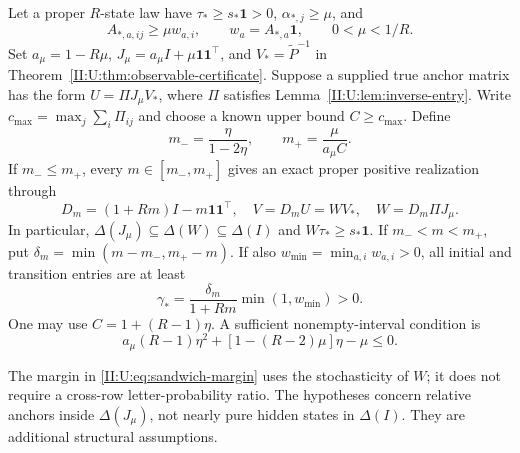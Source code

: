 \begin{theorem}
\label{II:U:thm:doeblin-sandwich}
Let a proper $R$-state law have $\tau_*\ge s_*\mathbf1>0$,
$\alpha_{*,j}\ge\mu$, and
\[
 A_{*,a,ij}\ge\mu w_{a,i},\qquad
 w_a=A_{*,a}\mathbf1,\qquad 0<\mu<1/R.
\]
Set $a_\mu=1-R\mu$, $J_\mu=a_\mu I+\mu\mathbf1\mathbf1^\top$,
and $V_*=\widetilde P^{-1}$ in Theorem~\ref{II:U:thm:observable-certificate}.
Suppose a supplied true anchor matrix has the form
$U=\Pi J_\mu V_*$, where $\Pi$ satisfies
Lemma~\ref{II:U:lem:inverse-entry}. Write
$c_{\max}=\max_j\sum_i\Pi_{ij}$ and choose a known upper bound
$C\ge c_{\max}$. Define
\[
 m_- =\frac{\eta}{1-2\eta},\qquad
 m_+=\frac{\mu}{a_\mu C}.
\]
If $m_-\le m_+$, every $m\in[m_-,m_+]$ gives an exact proper positive
realization through
\[
 D_m=(1+Rm)I-m\mathbf1\mathbf1^\top,\quad
 V=D_mU=WV_*,\quad W=D_m\Pi J_\mu.
\]
In particular,
$\Delta(J_\mu)\subseteq\Delta(W)\subseteq\Delta(I)$ and
$W\tau_*\ge s_*\mathbf1$. If $m_-<m<m_+$, put
$\delta_m=\min(m-m_-,m_+-m)$. If also
$w_{\min}=\min_{a,i}w_{a,i}>0$, all initial and transition entries are
at least
\begin{equation}
 \gamma_* =\frac{\delta_m}{1+Rm}\min(1,w_{\min})>0.
 \label{II:U:eq:sandwich-margin}
\end{equation}
One may use $C=1+(R-1)\eta$. A sufficient nonempty-interval condition is
\begin{equation}
 a_\mu(R-1)\eta^2+[1-(R-2)\mu]\eta-\mu\le0.
 \label{II:U:eq:sandwich-feasibility}
\end{equation}
\end{theorem}

The margin in \eqref{II:U:eq:sandwich-margin} uses the stochasticity of $W$;
it does not require a cross-row letter-probability ratio. The hypotheses
concern relative anchors inside $\Delta(J_\mu)$, not nearly pure hidden
states in $\Delta(I)$. They are additional structural assumptions.

